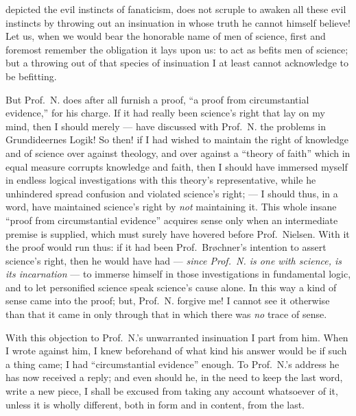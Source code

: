 \documentclass[12pt,a4paper]{book}
\begin{document}
depicted the evil instincts of fanaticism, does not scruple to awaken all these
evil instincts by throwing out an insinuation in whose truth he cannot himself
believe! Let us, when we would bear the honorable name of men of science, first
and foremost remember the obligation it lays upon us: to act as befits men of
science; but a throwing out of that species of insinuation I at least cannot
acknowledge to be befitting.

But Prof.\ N. does after all furnish a proof, ``a proof from circumstantial
evidence,'' for his charge. If it had really been science's right that lay on my
mind, then I should merely --- have discussed with Prof.\ N. the problems in
Grundideernes Logik! So then! if I had wished to maintain the right of knowledge
and of science over against theology, and over against a ``theory of faith''
which in equal measure corrupts knowledge
and faith, then I should have immersed myself in endless logical investigations
with this theory's representative, while he unhindered spread confusion and
violated science's right; --- I should thus, in a word, have maintained science's
right by \emph{not} maintaining it. This whole insane ``proof from circumstantial
evidence'' acquires sense only when an intermediate premise is supplied, which
must surely have hovered before Prof.\ Nielsen. With it the proof would run thus:
if it had been Prof.\ Brøchner's intention to assert science's right, then he
would have had --- \emph{since Prof.\ N. is one with science, is its incarnation}
--- to immerse himself in those investigations in fundamental logic, and to let
personified science
speak science's cause alone. In this way a kind of sense came into the proof;
but, Prof.\ N. forgive me! I cannot see it otherwise than that it came in only
through that in which there was \emph{no} trace of sense.

With this objection to Prof.\ N.'s unwarranted insinuation I part from him. When
I wrote against him, I knew beforehand of what kind his answer would be if such a
thing came; I had ``circumstantial evidence'' enough. To Prof.\ N.'s address he
has now received a reply; and even should he, in the need to keep the last word,
write a new piece, I shall be excused from taking any account whatsoever of it,
unless it is wholly different, both in form and in content, from the last.
\end{document}
